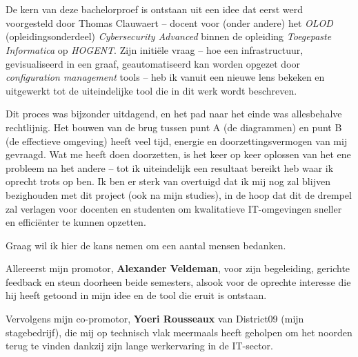 
\chapter*{}%
\label{ch:voorwoord}



De kern van deze bachelorproef is ontstaan uit een idee dat eerst werd voorgesteld door Thomas Clauwaert -- docent voor (onder andere) het \emph{OLOD} (opleidingsonderdeel) \emph{Cybersecurity Advanced} binnen de opleiding \emph{Toegepaste Informatica} op \emph{HOGENT}. Zijn initiële vraag -- hoe een infrastructuur, gevisualiseerd in een graaf, geautomatiseerd kan worden opgezet door \emph{configuration management} tools -- heb ik vanuit een nieuwe lens bekeken en uitgewerkt tot de uiteindelijke tool die in dit werk wordt beschreven.

Dit proces was bijzonder uitdagend, en het pad naar het einde was allesbehalve rechtlijnig. Het bouwen van de brug tussen punt A (de diagrammen) en punt B (de effectieve omgeving) heeft veel tijd, energie en doorzettingsvermogen van mij gevraagd. Wat me heeft doen doorzetten, is het keer op keer oplossen van het ene probleem na het andere -- tot ik uiteindelijk een resultaat bereikt heb waar ik oprecht trots op ben.
Ik ben er sterk van overtuigd dat ik mij nog zal blijven bezighouden met dit project (ook na mijn studies), in de hoop dat dit de drempel zal verlagen voor docenten en studenten om kwalitatieve IT-omgevingen sneller en efficiënter te kunnen opzetten.

Graag wil ik hier de kans nemen om een aantal mensen bedanken.

Allereerst mijn promotor, \textbf{Alexander Veldeman}, voor zijn begeleiding, gerichte feedback en steun doorheen beide semesters, alsook voor de oprechte interesse die hij heeft getoond in mijn idee en de tool die eruit is ontstaan.

Vervolgens mijn co-promotor, \textbf{Yoeri Rousseaux} van District09 (mijn stagebedrijf), die mij op technisch vlak meermaals heeft geholpen om het noorden terug te vinden dankzij zijn lange werkervaring in de IT-sector.

